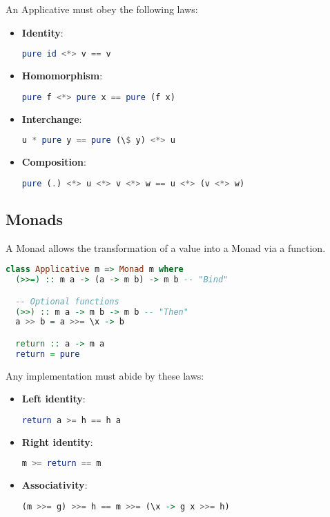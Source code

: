 An Applicative must obey the following laws:
\begin{itemize}
  \item \textbf{Identity}: \begin{lstlisting}[language=haskell]
pure id <*> v == v\end{lstlisting}
  \item \textbf{Homomorphism}: \begin{lstlisting}[language=haskell]
pure f <*> pure x == pure (f x)\end{lstlisting}
  \item \textbf{Interchange}: \begin{lstlisting}[language=haskell]
u * pure y == pure (\$ y) <*> u\end{lstlisting}
  \item \textbf{Composition}: \begin{lstlisting}[language=haskell]
pure (.) <*> u <*> v <*> w == u <*> (v <*> w)\end{lstlisting}
\end{itemize}

\subsection{Monads}
A Monad allows the transformation of a value into a Monad via a function.

\begin{lstlisting}[language=haskell]
class Applicative m => Monad m where
  (>>=) :: m a -> (a -> m b) -> m b -- "Bind"

  -- Optional functions
  (>>) :: m a -> m b -> m b -- "Then"
  a >> b = a >>= \x -> b

  return :: a -> m a
  return = pure
\end{lstlisting}

Any implementation must abide by these laws:
\begin{itemize}
  \item \textbf{Left identity}: \begin{lstlisting}[language=haskell]
return a >= h == h a\end{lstlisting}
  \item \textbf{Right identity}: \begin{lstlisting}[language=haskell]
m >= return == m\end{lstlisting}
  \item \textbf{Associativity}: \begin{lstlisting}[language=haskell]
(m >>= g) >>= h == m >>= (\x -> g x >>= h)\end{lstlisting}
\end{itemize}

